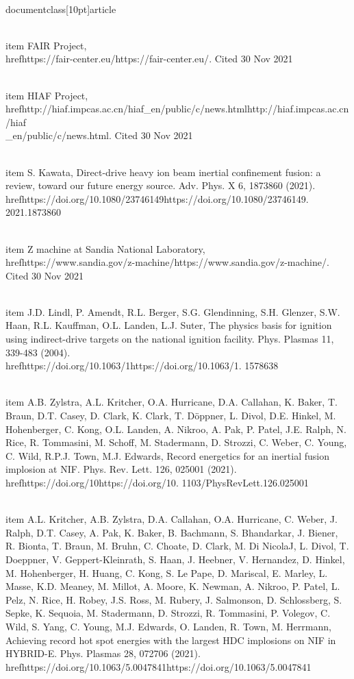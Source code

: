 \\documentclass[10pt]{article}
\begin{document}
{{{{{{  \\item FAIR Project, \\href{https://fair-center.eu/}{https://fair-center.eu/}. Cited 30 Nov 2021

  \\item HIAF Project, \\href{http://hiaf.impcas.ac.cn/hiaf_en/public/c/news.html}{http://hiaf.impcas.ac.cn/hiaf\\_en/public/c/news.html}. Cited 30 Nov 2021

  \\item S. Kawata, Direct-drive heavy ion beam inertial confinement fusion: a review, toward our future energy source. Adv. Phys. X 6, 1873860 (2021). \\href{https://doi.org/10.1080/23746149}{https://doi.org/10.1080/23746149}. 2021.1873860

  \\item Z machine at Sandia National Laboratory, \\href{https://www.sandia.gov/z-machine/}{https://www.sandia.gov/z-machine/}. Cited 30 Nov 2021

  \\item J.D. Lindl, P. Amendt, R.L. Berger, S.G. Glendinning, S.H. Glenzer, S.W. Haan, R.L. Kauffman, O.L. Landen, L.J. Suter, The physics basis for ignition using indirect-drive targets on the national ignition facility. Phys. Plasmas 11, 339-483 (2004). \\href{https://doi.org/10.1063/1}{https://doi.org/10.1063/1}. 1578638

  \\item A.B. Zylstra, A.L. Kritcher, O.A. Hurricane, D.A. Callahan, K. Baker, T. Braun, D.T. Casey, D. Clark, K. Clark, T. Döppner, L. Divol, D.E. Hinkel, M. Hohenberger, C. Kong, O.L. Landen, A. Nikroo, A. Pak, P. Patel, J.E. Ralph, N. Rice, R. Tommasini, M. Schoff, M. Stadermann, D. Strozzi, C. Weber, C. Young, C. Wild, R.P.J. Town, M.J. Edwards, Record energetics for an inertial fusion implosion at NIF. Phys. Rev. Lett. 126, 025001 (2021). \\href{https://doi.org/10}{https://doi.org/10}. 1103/PhysRevLett.126.025001

  \\item A.L. Kritcher, A.B. Zylstra, D.A. Callahan, O.A. Hurricane, C. Weber, J. Ralph, D.T. Casey, A. Pak, K. Baker, B. Bachmann, S. Bhandarkar, J. Biener, R. Bionta, T. Braun, M. Bruhn, C. Choate, D. Clark, M. Di NicolaJ, L. Divol, T. Doeppner, V. Geppert-Kleinrath, S. Haan, J. Heebner, V. Hernandez, D. Hinkel, M. Hohenberger, H. Huang, C. Kong, S. Le Pape, D. Mariscal, E. Marley, L. Masse, K.D. Meaney, M. Millot, A. Moore, K. Newman, A. Nikroo, P. Patel, L. Pelz, N. Rice, H. Robey, J.S. Ross, M. Rubery, J. Salmonson, D. Schlossberg, S. Sepke, K. Sequoia, M. Stadermann, D. Strozzi, R. Tommasini, P. Volegov, C. Wild, S. Yang, C. Young, M.J. Edwards, O. Landen, R. Town, M. Herrmann, Achieving record hot spot energies with the largest HDC implosions on NIF in HYBRID-E. Phys. Plasmas 28, 072706 (2021). \\href{https://doi.org/10.1063/5.0047841}{https://doi.org/10.1063/5.0047841}

}}}}}}
\end{document}

